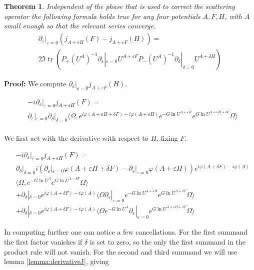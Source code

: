 \documentclass[b5paper,draft,openbib,12pt]{memoir}
\newtheorem{Thm}[Def]{Theorem}
\DeclareMathOperator{\tr}{tr}
\begin{document}
\begin{Thm}
Independent of the phase that is used to correct the scattering operator the following formula holds true for any 
 four potentials \(A,F,H\), with \(A\) small enough so that the relevant series converge.
\begin{multline}
\partial_\varepsilon |_{\varepsilon=0} ( j_{A+\varepsilon H} (F)-j_{A+\varepsilon F}(H)) = \\
2 \Im \tr \left(P_+ \left(U^A\right)^{-1} \partial_{\varepsilon}|_{\varepsilon=0} U^{A+\varepsilon F} P_-\left(U^A\right)^{-1} \partial_{\delta}|_{\delta=0} U^{A+\delta H}\right)
\end{multline}
\end{Thm}
\textbf{Proof:} We compute \(\partial_\varepsilon |_{\varepsilon=0} j_{A+\varepsilon F}(H) \). 

\begin{align*}
&-i\partial_\varepsilon |_{\varepsilon=0} j_{A+\varepsilon H}(F)=\\
&\partial_\varepsilon |_{\varepsilon=0} \partial_\delta |_{\delta=0} \langle \Omega, e^{i\varphi(A+\varepsilon H + \delta F)-i\varphi(A+\varepsilon H)} e^{-G \ln U^{A+\varepsilon H}} e^{G \ln U^{A+\varepsilon H + \delta F}}\Omega \rangle\\
\end{align*}

We first act with the derivative with respect to \(H\), fixing \(F\).

\begin{align*}
&-i\partial_\varepsilon |_{\varepsilon=0} j_{A+\varepsilon H}(F)=\\
&\partial_\delta |_{\delta=0}   i(\partial_\varepsilon |_{\varepsilon=0}\varphi(A+\varepsilon H + \delta F)-\partial_\varepsilon |_{\varepsilon=0}\varphi(A+\varepsilon H ))e^{i\varphi(A + \delta F)-i\varphi(A)} \\
&\langle \Omega, e^{-G \ln U^{A}} e^{G \ln U^{A + \delta F}}\Omega \rangle\\
&+\partial_\delta |_{\delta=0} e^{i\varphi(A + \delta F)-i\varphi(A)} \langle \Omega
\partial_\varepsilon |_{\varepsilon=0} e^{-G \ln U^{A+\varepsilon H}} e^{G \ln U^{A + \delta F}}\Omega \rangle\\
&+\partial_\delta |_{\delta=0} e^{i\varphi(A + \delta F)-i\varphi(A)} 
 \langle \Omega e^{-G \ln U^{A}} \partial_\varepsilon |_{\varepsilon=0}e^{G \ln U^{A+\varepsilon H + \delta F}}\Omega \rangle
\end{align*}

In computing further one can notice a few cancellations. For the first summand the first factor vanishes if \(\delta\) is set to zero, so the only 
the first summand in the product rule will not vanish. For the second and third summand we will use lemma \ref{lemma:derivativeJ},
giving
\end{document}
